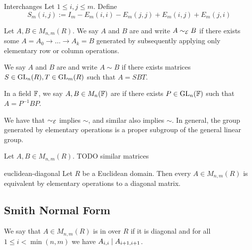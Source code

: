 \documentclass{styles/tufte}
\begin{document}
  \begin{definition}{Interchanges}{}
    Let $1 \leqslant i, j \leqslant m$. Define
    \[ S_m(i, j) := I_m - E_m(i, i) - E_m(j, j) + E_m(i, j) + E_m(j, i) \]
  \end{definition}
  
  \begin{definition}{}{}
    Let $A, B \in M_{n,m}(R)$. We say $A$ and $B$ are  and write $A \sim_\mathcal{E} B$ if there exists some $A = A_0 \to \dots \to A_k = B$ generated by subsequently applying only elementary row or column operations.
    
    We say $A$ and $B$ are  and write $A \sim B$ if there exists matrices $S \in \mathrm{GL}_n(R), T \in \mathrm{GL}_m(R)$ such that $A = SBT$.
    
    In a field $\mathbb{F}$, we say $A, B \in M_n(\mathbb{F})$ are  if there exists $P \in \mathrm{GL}_n(\mathbb{F})$ such that $A = P^{-1}BP$.
  \end{definition}
  
  We have that $\sim_\mathcal{E}$ implies $\sim$, and similar also implies $\sim$. In general, the group generated by elementary operations is a proper subgroup of the general linear group.
  
  
  \begin{example}{}{}
    Let $A, B \in M_{n,m}(R)$. TODO similar matrices
  \end{example}
  
  \begin{theorem}{}{euclidean-diagonal}
    Let $R$ be a Euclidean domain. Then every $A \in M_{n,m}(R)$ is equivalent by elementary operations to a diagonal matrix.
  \end{theorem}


\subsection{Smith Normal Form}

  \begin{definition}{}{}
    We say that $A \in M_{n,m}(R)$ is in  over $R$ if it is diagonal and for all $1 \leqslant i < \min(n, m)$ we have $A_{i,i} \mid A_{i+1, i+1}$.
  \end{definition}
  
\end{document}
